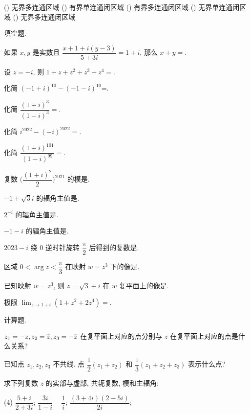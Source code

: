 \begin{homework}
\begin{exlist}
\begin{taskschoice}
          () 无界多连通区域
          () 有界单连通闭区域
          () 有界多连通闭区域
          () 无界单连通闭区域
          () 无界多连通闭区域
        \end{taskschoice}
    \end{exlist}
\item 填空题.
    \begin{exlist}
      \item 如果 $x,y$ 是实数且 $\dfrac{x+1+i(y-3)}{5+3i}=1+i$, 那么 $x+y=$\fillblank{}.
      \item 设 $z=-i$, 则 $1+z+z^2+z^3+z^4=$\fillblank{}.
      \item 化简 $(-1+i)^{10}-(-1-i)^{10}$=\fillblank{}.
      \item 化简 $\dfrac{(1+i)^3}{(1-i)^3}=$\fillblank{}.
      \item 化简 $i^{2022}-(-i)^{2022}=$\fillblank{}.
      \item 化简 $\dfrac{(1+i)^{101}}{(1-i)^{99}}=$\fillblank{}.
      \item 复数 $\biggl(\dfrac{(1+i)^2}2\biggr)^{2021}$ 的模是\fillblank{}.
      \item $-1+\sqrt 3i$ 的辐角主值是\fillblank{}.
      \item $2^{-i}$ 的辐角主值是\fillblank{}.
      \item $-1-i$ 的辐角主值是\fillblank{}.
      \item $2023-i$ 绕 $0$ 逆时针旋转 $\dfrac\pi2$ 后得到的复数是\fillblank{}.
      \item 区域 $0<\arg z<\dfrac\pi3$ 在映射 $w=z^3$ 下的像是\fillblank[4cm]{}.
      \item 已知映射 $w=z^3$, 则 $z=\sqrt3+i$ 在 $w$ 复平面上的像是\fillblank{}.
      \item 极限 $\displaystyle\lim_{z\to1+i}(1+z^2+2z^4)=$\fillblank{}.
    \end{exlist}
  \item 计算题.
    \begin{exlist}
      \item $z_1=-z,z_2=\overline z,z_3=-\overline{z}$ 在复平面上对应的点分别与 $z$ 在复平面上对应的点是什么关系?
      \item 已知点 $z_1,z_2,z_3$ 不共线. 点 $\dfrac12(z_1+z_2)$ 和 $\dfrac13(z_1+z_2+z_3)$ 表示什么点?
      \item 求下列复数 $z$ 的实部与虚部, 共轭复数, 模和主辐角:
        \begin{tasks}(4)
          \task $\dfrac{5+i}{2+3i}$;
          \task $\dfrac{3i}{1-i}-\dfrac1i$;
          \task $\dfrac{(3+4i)(2-5i)}{2i}$;

\end{tasks}
\end{exlist}
\end{homework}

